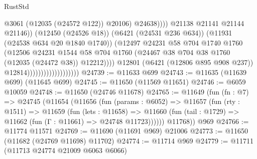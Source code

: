 \begin{lexlean}{RustStd}
\begin{coremodule}
                                                          @3061
                                                          (@12035 (@24572 @122))
                                                          @20106)
                                                        @24638))))
                                                @21138
                                                @21141
                                                @21144
                                                @21146))
                                            (@12450 (@24526 @18))
                                            (@6421 (@24531 @236 @634))
                                            (@11931 (@24538 @634 @20 @1840 @1740))
                                            (@12497
                                              @24231
                                              @58
                                              @704
                                              @1740
                                              @1760
                                              (@12506
                                                @24231
                                                @1544
                                                @58
                                                @704
                                                @1760
                                                (@24467
                                                  @38
                                                  @704
                                                  @38
                                                  @1760
                                                  (@12035 (@24472 @38))
                                                  @12212))))
                                          @12801
                                          (@6421 (@12806 @895 @908 @237))
                                          @12814)))))))))))))))))))
@24739 := @11633 @699
@24743 := @11635 (@11639 @699) (@11645 @699)
@24745 := @11650 (@11569 @11651)
@24746 := @6059 @10059
@24748 := @11650 (@24746 @11678)
@24765 := @11649
    (fun (fn : @7) =>
    @24745
      (@11654
        (@11656
          (fun (params : @6052) =>
          @11657
            (fun (rty : @1511) =>
            @11659
              (fun (lets : @11658) =>
              @11660 (fun (tail : @1729) => @11662 (fun (Γ : @11661) => @24748 @11723))))))
        @11768))
    @969
@24766 := @11774 @11571
@24769 := @11690 (@11691 @969) @21006
@24773 := @11650 (@11682 (@24769 @11698) @11702)
@24774 := @11714 @969
@24779 := @11711 (@11713 @24774 @21009 @6063 @6066)

\end{coremodule}
\end{lexlean}
